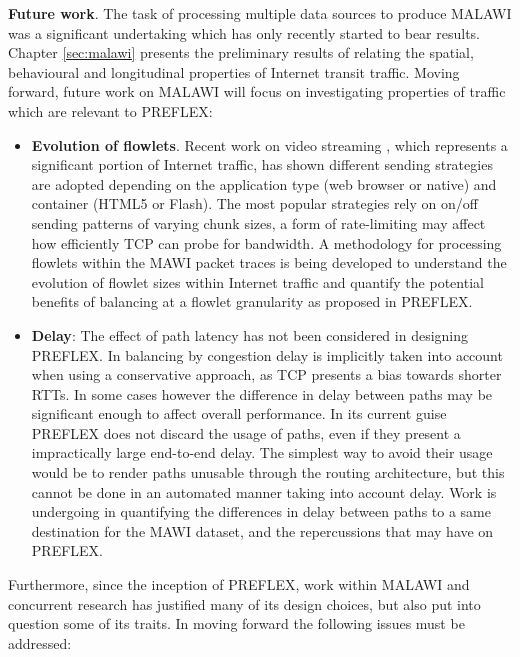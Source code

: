 \textbf{Future work}. The task of processing multiple data sources to produce \ac{MALAWI} was a significant undertaking which has only recently started to bear results.
Chapter \ref{sec:malawi} presents the preliminary results of relating the spatial, behavioural and longitudinal properties of Internet transit traffic.
Moving forward, future work on \ac{MALAWI} will focus on investigating properties of traffic which are relevant to \ac{PREFLEX}:

\begin{itemize}
\item{
    \textbf{Evolution of flowlets}. Recent work on video streaming \cite{Rao:2011p547} , which represents a significant portion of Internet traffic, 
    has shown different sending strategies are adopted depending on the application type (web browser or native) and container (HTML5 or Flash).
    The most popular strategies rely on on/off sending patterns of varying chunk sizes, a form of rate-limiting may affect how efficiently \ac{TCP} can probe for bandwidth.
    A methodology for processing flowlets within the \ac{MAWI} packet traces is being developed to understand the evolution of flowlet sizes within Internet traffic and quantify the potential benefits of balancing at a flowlet granularity as proposed in \ac{PREFLEX}.
}

\item{
    \textbf{Delay}: The effect of path latency has not been considered in designing \ac{PREFLEX}.
    In balancing by congestion delay is implicitly taken into account when using a conservative approach, as \ac{TCP} presents a bias towards shorter \acp{RTT}.
    In some cases however the difference in delay between paths may be significant enough to affect overall performance.
    In its current guise \ac{PREFLEX} does not discard the usage of paths, even if they present a impractically large end-to-end delay.
    The simplest way to avoid their usage would be to render paths unusable through the routing architecture, but this cannot be done in an automated manner taking into account delay.
    Work is undergoing in quantifying the differences in delay between paths to a same destination for the \ac{MAWI} dataset, and the repercussions that may have on \ac{PREFLEX}.
}
\end{itemize}

Furthermore, since the inception of \ac{PREFLEX}, work within \ac{MALAWI} and concurrent research has justified many of its design choices, but also put into question some of its traits.
In moving forward the following issues must be addressed:

